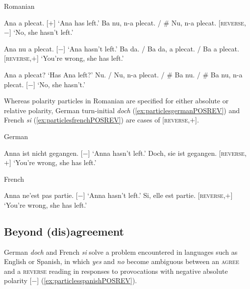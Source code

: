 \begin{exe}
	\ex Romanian \label{ex:particlesromanianNEGDEN} 
	\begin{xlist}[A:]
	 Ana a plecat. \hfill [$+$]
	\glt `Ana has left.' 
	 Ba nu, n-a plecat. / \# Nu, n-a plecat. \hfill [\textsc{reverse},$-$] 
	\glt `No, she hasn't left.'  
	\end{xlist}
\ex \label{ex:particlesromanianPOSDEN} 
	\begin{xlist}[A:]
	 Ana nu a plecat. \hfill [$-$]
	\glt `Ana hasn't left.' 
	 Ba da. / Ba da, a plecat. / Ba a plecat. \hfill [\textsc{reverse},$+$]
	\glt `You're wrong, she has left.'  
	\end{xlist}
\ex \label{ex:particlesromanianNEGREV} 
	\begin{xlist}[A:]
	 Ana a plecat? 
	\glt `Has Ana left?'
	 Nu. / Nu, n-a plecat. / \# Ba nu. / \# Ba nu, n-a plecat. \hfill [$-$] 
	\glt `No, she hasn't.' 
	\end{xlist}
\end{exe}

Whereas polarity particles in Romanian are specified for either absolute or relative polarity, German turn-initial \textit{doch} (\ref{ex:particlesgermanPOSREV}) and French \textit{si} (\ref{ex:particlesfrenchPOSREV}) are cases of [\textsc{reverse},$+$].

\begin{exe}
	\ex German\label{ex:particlesgermanPOSREV}
	\begin{xlist}[A:]
	 Anna ist nicht gegangen. \hfill [$-$]
    \glt `Anna hasn't left.'
	 Doch, sie ist gegangen. \hfill [\textsc{reverse},$+$]
	\glt `You're wrong, she has left.' 
	\end{xlist}

	\ex French \label{ex:particlesfrenchPOSREV} 
	\begin{xlist}[A:]
	 Anna ne'est pas partie. \hfill [$-$]
	\glt `Anna hasn't left.' 
	 Si, elle est partie. \hfill [\textsc{reverse},$+$]
	\glt `You're wrong, she has left.' 
	\end{xlist}
\end{exe}

\subsection{Beyond (dis)agreement}
\label{ch:3.3.2}

German \textit{doch} and French \textit{si} solve a problem encountered in languages such as English or Spanish, in which \textit{yes} and \textit{no} become ambiguous between an \textsc{agree} and a \textsc{reverse} reading in responses to provocations with negative absolute polarity [$-$] (\ref{ex:particlesspanishPOSREV}).

